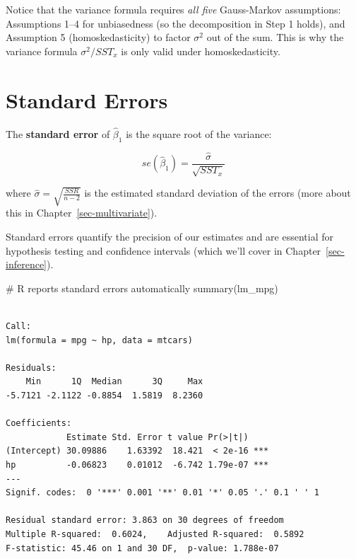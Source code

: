 \documentclass[
  letterpaper,
  DIV=11,
  numbers=noendperiod]{scrreprt}
\newenvironment{Shaded}{\begin{snugshade}}{\end{snugshade}}
\newcommand{\CommentTok}[1]{\textcolor[rgb]{0.37,0.37,0.37}{#1}}
\newcommand{\FunctionTok}[1]{\textcolor[rgb]{0.28,0.35,0.67}{#1}}
\newcommand{\NormalTok}[1]{\textcolor[rgb]{0.00,0.23,0.31}{#1}}
\begin{document}
\begin{tcolorbox}[enhanced jigsaw, arc=.35mm, bottomrule=.15mm, bottomtitle=1mm, breakable, colback=white, colbacktitle=quarto-callout-note-color!10!white, colframe=quarto-callout-note-color-frame, coltitle=black, left=2mm, leftrule=.75mm, opacityback=0, opacitybacktitle=0.6, rightrule=.15mm, title=\textcolor{quarto-callout-note-color}{\faInfo}\hspace{0.5em}{Which Assumptions Did We Use?}, titlerule=0mm, toprule=.15mm, toptitle=1mm]

Notice that the variance formula requires \emph{all five} Gauss-Markov
assumptions: Assumptions 1--4 for unbiasedness (so the decomposition in
Step 1 holds), and Assumption 5 (homoskedasticity) to factor
\(\sigma^2\) out of the sum. This is why the variance formula
\(\sigma^2 / SST_x\) is only valid under homoskedasticity.

\end{tcolorbox}

\section{Standard Errors}\label{standard-errors}

The \textbf{standard error} of \(\hat{\beta}_1\) is the square root of
the variance:

\[
se(\hat{\beta}_1) = \frac{\hat{\sigma}}{\sqrt{SST_x}}
\]

where \(\hat{\sigma} = \sqrt{\frac{SSR}{n-2}}\) is the estimated
standard deviation of the errors (more about this in
Chapter~\ref{sec-multivariate}).

Standard errors quantify the precision of our estimates and are
essential for hypothesis testing and confidence intervals (which we'll
cover in Chapter~\ref{sec-inference}).

\begin{Shaded}
\begin{Highlighting}[]
\CommentTok{\# R reports standard errors automatically}
\FunctionTok{summary}\NormalTok{(lm\_mpg)}
\end{Highlighting}
\end{Shaded}

\begin{verbatim}

Call:
lm(formula = mpg ~ hp, data = mtcars)

Residuals:
    Min      1Q  Median      3Q     Max 
-5.7121 -2.1122 -0.8854  1.5819  8.2360 

Coefficients:
            Estimate Std. Error t value Pr(>|t|)    
(Intercept) 30.09886    1.63392  18.421  < 2e-16 ***
hp          -0.06823    0.01012  -6.742 1.79e-07 ***
---
Signif. codes:  0 '***' 0.001 '**' 0.01 '*' 0.05 '.' 0.1 ' ' 1

Residual standard error: 3.863 on 30 degrees of freedom
Multiple R-squared:  0.6024,    Adjusted R-squared:  0.5892 
F-statistic: 45.46 on 1 and 30 DF,  p-value: 1.788e-07
\end{verbatim}
\end{document}
